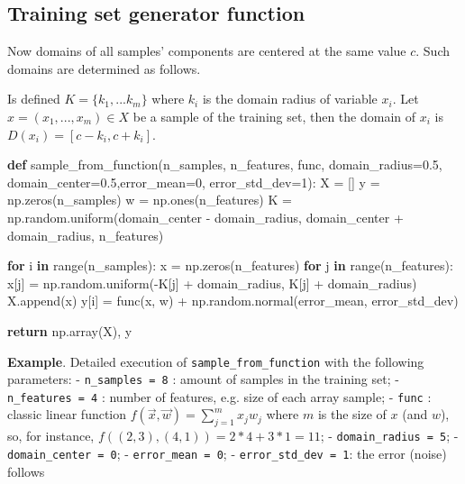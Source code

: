 \documentclass[11pt]{article}
\newenvironment{Shaded}{}{}
\newcommand{\KeywordTok}[1]{\textcolor[rgb]{0.00,0.44,0.13}{\textbf{{#1}}}}
\newcommand{\DecValTok}[1]{\textcolor[rgb]{0.25,0.63,0.44}{{#1}}}
\newcommand{\FloatTok}[1]{\textcolor[rgb]{0.25,0.63,0.44}{{#1}}}
\newcommand{\NormalTok}[1]{{#1}}
\newcommand{\ControlFlowTok}[1]{\textcolor[rgb]{0.00,0.44,0.13}{\textbf{{#1}}}}
\newcommand{\OperatorTok}[1]{\textcolor[rgb]{0.40,0.40,0.40}{{#1}}}
\newcommand{\BuiltInTok}[1]{{#1}}
\begin{document}
\subsection{Training set generator
function}\label{training-set-generator-function}

Now domains of all samples' components are centered at the same value
\(c\). Such domains are determined as follows.

Is defined \(K = \{k_1,...k_m\}\) where \(k_i\) is the domain radius of
variable \(x_i\). Let \(x=(x_1,...,x_m) \in X\) be a sample of the
training set, then the domain of \(x_i\) is \(D(x_i) = [c-k_i, c+k_i]\).

\begin{Shaded}
\begin{Highlighting}[]
\KeywordTok{def}\NormalTok{ sample_from_function(n_samples, n_features, func, domain_radius}\OperatorTok{=}\FloatTok{0.5}\NormalTok{, domain_center}\OperatorTok{=}\FloatTok{0.5}\NormalTok{,error_mean}\OperatorTok{=}\DecValTok{0}\NormalTok{, error_std_dev}\OperatorTok{=}\DecValTok{1}\NormalTok{):}
\NormalTok{    X }\OperatorTok{=}\NormalTok{ []}
\NormalTok{    y }\OperatorTok{=}\NormalTok{ np.zeros(n_samples)}
\NormalTok{    w }\OperatorTok{=}\NormalTok{ np.ones(n_features)}
\NormalTok{    K }\OperatorTok{=}\NormalTok{ np.random.uniform(domain_center }\OperatorTok{-}\NormalTok{ domain_radius, domain_center }\OperatorTok{+}\NormalTok{ domain_radius, n_features)}

    \ControlFlowTok{for}\NormalTok{ i }\KeywordTok{in} \BuiltInTok{range}\NormalTok{(n_samples):}
\NormalTok{        x }\OperatorTok{=}\NormalTok{ np.zeros(n_features)}
        \ControlFlowTok{for}\NormalTok{ j }\KeywordTok{in} \BuiltInTok{range}\NormalTok{(n_features):}
\NormalTok{            x[j] }\OperatorTok{=}\NormalTok{ np.random.uniform(}\OperatorTok{-}\NormalTok{K[j] }\OperatorTok{+}\NormalTok{ domain_radius, K[j] }\OperatorTok{+}\NormalTok{ domain_radius)}
\NormalTok{        X.append(x)}
\NormalTok{        y[i] }\OperatorTok{=}\NormalTok{ func(x, w) }\OperatorTok{+}\NormalTok{ np.random.normal(error_mean, error_std_dev)}

\ControlFlowTok{return}\NormalTok{ np.array(X), y}
\end{Highlighting}
\end{Shaded}

    \textbf{Example}. Detailed execution of \texttt{sample\_from\_function}
with the following parameters: - \texttt{n\_samples\ =\ 8} : amount of
samples in the training set; - \texttt{n\_features\ =\ 4} : number of
features, e.g. size of each array sample; - \texttt{func} : classic
linear function \(f(\vec{x},\vec{w})=\sum_{j=1}^{m} x_j w_j\) where
\(m\) is the size of \(x\) (and \(w\)), so, for instance,
\(f((2,3),(4,1))=2*4+3*1=11\); - \texttt{domain\_radius\ =\ 5}; -
\texttt{domain\_center\ =\ 0}; - \texttt{error\_mean\ =\ 0}; -
\texttt{error\_std\_dev\ =\ 1}: the error (noise) follows
\end{document}
